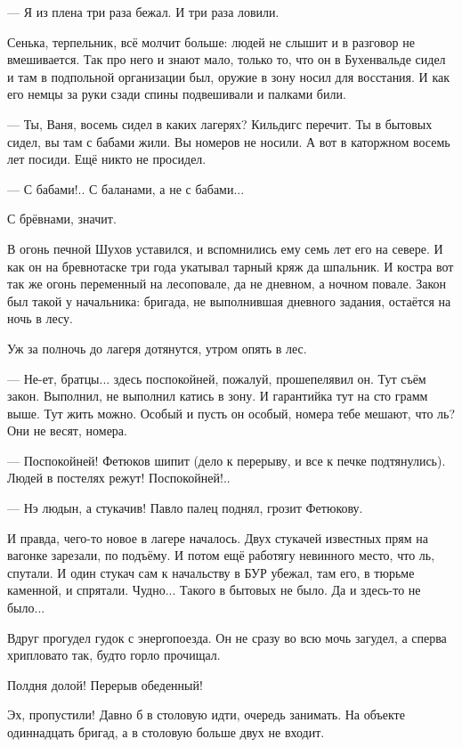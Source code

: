 --- Я из плена три раза бежал. И три раза ловили.

Сенька, терпельник, всё молчит больше: людей не слышит и в разговор не вмешивается. Так про
него и знают мало, только то, что он в Бухенвальде сидел и там в подпольной организации был,
оружие в зону носил для восстания. И как его немцы за руки сзади спины подвешивали и палками
били.

--- Ты, Ваня, восемь сидел \dash в каких лагерях? \dash Кильдигс перечит. \Dash Ты в бытовых сидел, вы там с
бабами жили. Вы номеров не носили. А вот в каторжном восемь лет посиди. Ещё никто не просидел.

--- С бабами!.. С баланами, а не с бабами...

С брёвнами, значит.

В огонь печной Шухов уставился, и вспомнились ему семь лет его на севере. И как он на
бревнотаске три года укатывал тарный кряж да шпальник. И костра вот так же огонь переменный
\dash на лесоповале, да не дневном, а ночном повале. Закон был такой у начальника: бригада, не
выполнившая дневного задания, остаётся на ночь в лесу.

Уж за полночь до лагеря дотянутся, утром опять в лес.

--- Не-ет, братцы... здесь поспокойней, пожалуй, \dash прошепелявил он. \Dash Тут съём \dash закон.
Выполнил, не выполнил \dash катись в зону. И гарантийка тут на сто грамм выше. Тут \dash жить можно.
Особый \dash и пусть он особый, номера тебе мешают, что ль? Они не весят, номера.

--- Поспокойней! \dash Фетюков шипит (дело к перерыву, и все к печке подтянулись). \Dash Людей в
постелях режут! Поспокойней!..

--- Нэ людын, а стукачив! \dash Павло палец поднял, грозит Фетюкову.

И правда, чего-то новое в лагере началось. Двух стукачей известных прям на вагонке зарезали,
по подъёму. И потом ещё работягу невинного \dash место, что ль, спутали. И один стукач сам к
начальству в БУР убежал, там его, в тюрьме каменной, и спрятали. Чудно... Такого в бытовых не
было. Да и здесь-то не было...

Вдруг прогудел гудок с энергопоезда. Он не сразу во всю мочь загудел, а сперва хрипловато
так, будто горло прочищал.

Полдня \dash долой! Перерыв обеденный!

Эх, пропустили! Давно б в столовую идти, очередь занимать. На объекте одиннадцать бригад, а в
столовую больше двух не входит.

